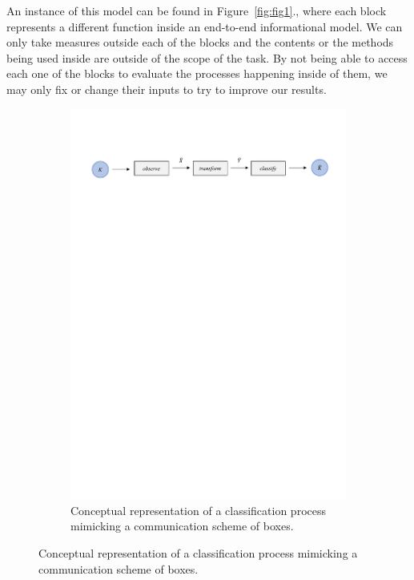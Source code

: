 An instance of this model can be found in Figure~\ref{fig:fig1}., where each block represents a different function inside an end-to-end informational model. We can only take measures outside each of the blocks and the contents or the methods being used inside are outside of the scope of the task. By not being able to access each one of the blocks to evaluate the processes happening inside of them, we may only fix or change their inputs to try to improve our results.
%
\begin{figure}[H]
\begin{subfigure}{1\textwidth}  
 \centering
  \includegraphics[width=16cm]{Figuras_tfg/Figura1_tfg}
  \caption{Conceptual representation of a classification process mimicking a communication scheme of boxes.}
 \label{fig:fig1b} 
\end{subfigure}%


\end{figure}
